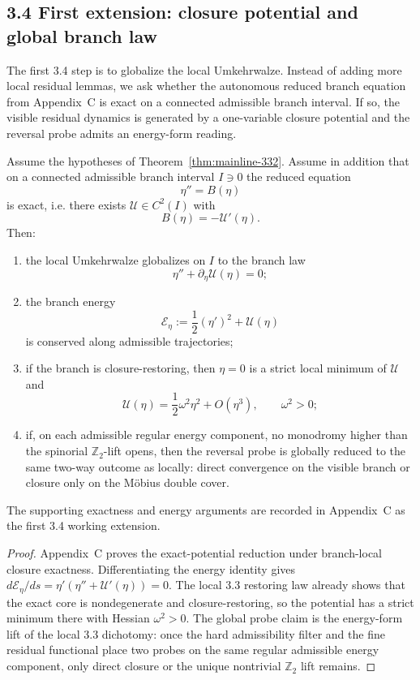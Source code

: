 \subsection*{3.4 First extension: closure potential and global branch law}
The first 3.4 step is to globalize the local Umkehrwalze. Instead of adding more local residual lemmas, we ask whether the autonomous reduced branch equation from Appendix~C is exact on a connected admissible branch interval. If so, the visible residual dynamics is generated by a one-variable closure potential and the reversal probe admits an energy-form reading.

\begin{theorem}
\label{thm:mainline-340}
Assume the hypotheses of Theorem~\ref{thm:mainline-332}. Assume in addition that on a connected admissible branch interval $I\ni 0$ the reduced equation
\[
  \eta'' = B(\eta)
\]
is exact, i.e. there exists $\mathcal U\in C^2(I)$ with
\[
  B(\eta) = -\mathcal U'(\eta).
\]
Then:
\begin{enumerate}[label=(\roman*)]
  \item the local Umkehrwalze globalizes on $I$ to the branch law
  \[
    \eta''+\partial_\eta\mathcal U(\eta)=0;
  \]
  \item the branch energy
  \[
    \mathcal E_\eta := \frac12(\eta')^2 + \mathcal U(\eta)
  \]
  is conserved along admissible trajectories;
  \item if the branch is closure-restoring, then $\eta=0$ is a strict local minimum of $\mathcal U$ and
  \[
    \mathcal U(\eta) = \frac12 \omega^2 \eta^2 + O(\eta^3),
    \qquad \omega^2>0;
  \]
  \item if, on each admissible regular energy component, no monodromy higher than the spinorial $\mathbb Z_2$-lift opens, then the reversal probe is globally reduced to the same two-way outcome as locally: direct convergence on the visible branch or closure only on the M\"obius double cover.
\end{enumerate}
The supporting exactness and energy arguments are recorded in Appendix~C as the first 3.4 working extension.
\end{theorem}

\begin{proof}
Appendix~C proves the exact-potential reduction under branch-local closure exactness. Differentiating the energy identity gives $d\mathcal E_\eta/ds = \eta'(\eta''+\mathcal U'(\eta))=0$. The local 3.3 restoring law already shows that the exact core is nondegenerate and closure-restoring, so the potential has a strict minimum there with Hessian $\omega^2>0$. The global probe claim is the energy-form lift of the local 3.3 dichotomy: once the hard admissibility filter and the fine residual functional place two probes on the same regular admissible energy component, only direct closure or the unique nontrivial $\mathbb Z_2$ lift remains.
\end{proof}


